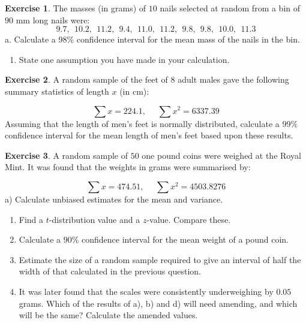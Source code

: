 \documentclass[
]{book}
\providecommand{\tightlist}{%
  \setlength{\itemsep}{0pt}\setlength{\parskip}{0pt}}
\theoremstyle{definition}
\theoremstyle{definition}
\theoremstyle{definition}
\newtheorem{exercise}{Exercise}[chapter]
\theoremstyle{definition}
\theoremstyle{remark}
\begin{document}
\begin{exercise}

The masses (in grams) of \(10\) nails selected at random from a bin of \(90\) mm long nails were:
\[9.7, \ \ 10.2, \ \  11.2, \ \  9.4, \ \  11.0, \ \  11.2, \ \  9.8, \ \  9.8, \ \  10.0, \ \  11.3\]
a. Calculate a 98\% confidence interval for the mean mass of the nails in the bin.

\begin{enumerate}
\def\labelenumi{\alph{enumi}.}
\setcounter{enumi}{1}
\tightlist
\item
  State one assumption you have made in your calculation.
\end{enumerate}

\end{exercise}

\begin{exercise}
A random sample of the feet of \(8\) adult males gave the following summary
statistics of length \(x\) (in cm):

\[\sum x = 224.1 , \ \ \ \ \ \ \sum x^2 = 6337.39 \]
Assuming that the length of men's feet is normally distributed, calculate a \(99\%\)
confidence interval for the mean length of men's feet based upon these results.
\end{exercise}

\begin{exercise}

A random sample of \(50\) one pound coins were weighed at the Royal Mint. It was found that the weights in grams were summarised by:

\[\sum x = 474.51 , \ \ \ \ \ \ \sum x^2 = 4503.8276 \]
a) Calculate unbiased estimates for the mean and variance.

\begin{enumerate}
\def\labelenumi{\alph{enumi})}
\setcounter{enumi}{1}
\item
  Find a \(t\)-distribution value and a \(z\)-value. Compare these.
\item
  Calculate a \(90\%\) confidence interval for the mean weight of a pound coin.
\item
  Estimate the size of a random sample required to give an interval of half the width of that calculated in the previous question.
\item
  It was later found that the scales were consistently underweighing by \(0.05\) grams. Which of the results of a), b) and d) will need amending, and which will be the same? Calculate the amended values.
\end{enumerate}

\end{exercise}
\end{document}
